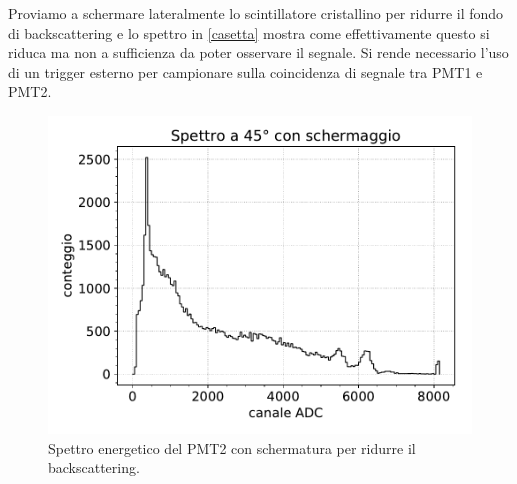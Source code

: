 Proviamo a schermare lateralmente lo scintillatore cristallino per ridurre il fondo di backscattering e lo spettro in \autoref{casetta} mostra come effettivamente questo si riduca ma non a sufficienza da poter osservare il segnale. Si rende necessario l'uso di un trigger esterno per campionare sulla coincidenza di segnale tra PMT1 e PMT2.

\begin{figure}
\centering
\includegraphics[width=25 em]{45gs}
\caption{Spettro energetico del PMT2 con schermatura per ridurre il backscattering.}
\label{casetta}
\end{figure}

